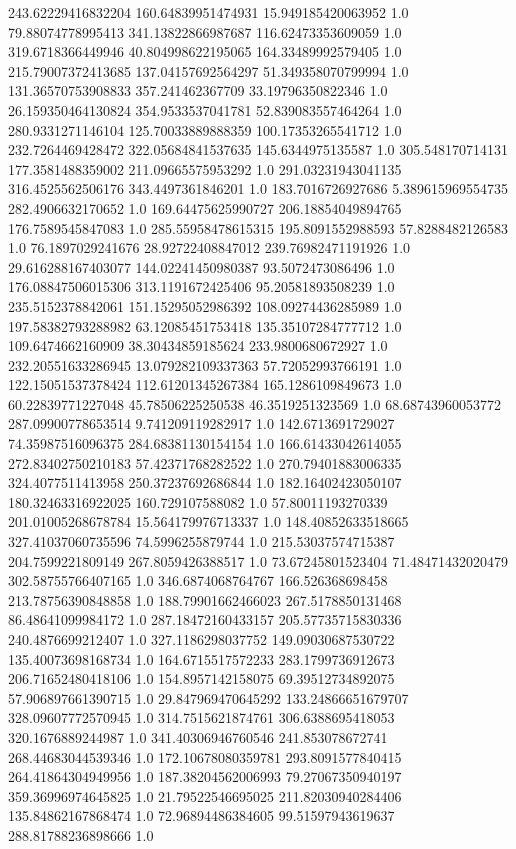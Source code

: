 243.62229416832204	160.64839951474931	15.949185420063952	1.0
79.88074778995413	341.13822866987687	116.62473353609059	1.0
319.6718366449946	40.804998622195065	164.33489992579405	1.0
215.79007372413685	137.04157692564297	51.349358070799994	1.0
131.36570753908833	357.241462367709	33.19796350822346	1.0
26.159350464130824	354.9533537041781	52.839083557464264	1.0
280.9331271146104	125.70033889888359	100.17353265541712	1.0
232.7264469428472	322.05684841537635	145.6344975135587	1.0
305.548170714131	177.3581488359002	211.09665575953292	1.0
291.03231943041135	316.4525562506176	343.4497361846201	1.0
183.7016726927686	5.389615969554735	282.4906632170652	1.0
169.64475625990727	206.18854049894765	176.7589545847083	1.0
285.55958478615315	195.8091552988593	57.8288482126583	1.0
76.1897029241676	28.92722408847012	239.76982471191926	1.0
29.616288167403077	144.02241450980387	93.5072473086496	1.0
176.08847506015306	313.1191672425406	95.20581893508239	1.0
235.5152378842061	151.15295052986392	108.09274436285989	1.0
197.58382793288982	63.12085451753418	135.35107284777712	1.0
109.6474662160909	38.30434859185624	233.9800680672927	1.0
232.20551633286945	13.079282109337363	57.72052993766191	1.0
122.15051537378424	112.61201345267384	165.1286109849673	1.0
60.22839771227048	45.78506225250538	46.3519251323569	1.0
68.68743960053772	287.09900778653514	9.741209119282917	1.0
142.6713691729027	74.35987516096375	284.68381130154154	1.0
166.61433042614055	272.83402750210183	57.42371768282522	1.0
270.79401883006335	324.4077511413958	250.37237692686844	1.0
182.16402423050107	180.32463316922025	160.729107588082	1.0
57.80011193270339	201.01005268678784	15.564179976713337	1.0
148.40852633518665	327.41037060735596	74.5996255879744	1.0
215.53037574715387	204.7599221809149	267.8059426388517	1.0
73.67245801523404	71.48471432020479	302.58755766407165	1.0
346.6874068764767	166.526368698458	213.78756390848858	1.0
188.79901662466023	267.5178850131468	86.48641099984172	1.0
287.18472160433157	205.57735715830336	240.4876699212407	1.0
327.1186298037752	149.09030687530722	135.40073698168734	1.0
164.6715517572233	283.1799736912673	206.71652480418106	1.0
154.8957142158075	69.39512734892075	57.906897661390715	1.0
29.847969470645292	133.24866651679707	328.09607772570945	1.0
314.7515621874761	306.6388695418053	320.1676889244987	1.0
341.40306946760546	241.853078672741	268.44683044539346	1.0
172.10678080359781	293.8091577840415	264.41864304949956	1.0
187.38204562006993	79.27067350940197	359.36996974645825	1.0
21.79522546695025	211.82030940284406	135.84862167868474	1.0
72.96894486384605	99.51597943619637	288.81788236898666	1.0
